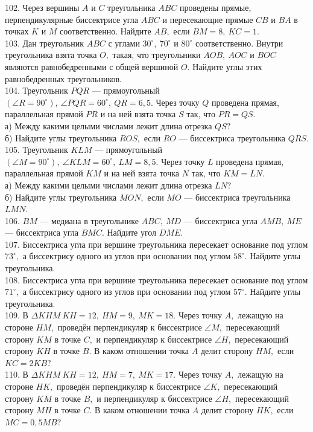 \documentclass[12pt]{article}
\begin{document}
102. Через вершины $A$ и $C$ треугольника $ABC$ проведены прямые, перпендикулярные биссектрисе угла $ABC$ и пересекающие прямые $CB$ и $BA$ в точках $K$ и $M$ соответственно. Найдите $AB,$ если $BM=8,\ KC=1.$\\
103. Дан треугольник $ABC$ с углами $30^\circ,\ 70^\circ$ и $80^\circ$ соответственно. Внутри треугольника взята точка $O,$ такая, что треугольники $AOB,\ AOC$ и $BOC$ являются равнобедренными с общей вершиной $O.$ Найдите углы этих равнобедренных треугольников.\\
104. Треугольник $PQR$ --- прямоугольный $(\angle R=90^\circ),\ \angle PQR=60^\circ,\ QR=6,5.$ Через точку $Q$ проведена прямая, параллельная прямой $PR$ и на ней взята точка $S$ так, что $PR=QS.$\\
а) Между какими целыми числами лежит длина отрезка $QS?$\\
б) Найдите углы треугольника $ROS,$ если $RO$ --- биссектриса треугольника $QRS.$\\
105. Треугольник $KLM$ --- прямоугольный $(\angle M=90^\circ),\ \angle KLM=60^\circ,\ LM=8,5.$ Через точку $L$ проведена прямая, параллельная прямой $KM$ и на ней взята точка $N$ так, что $KM=LN.$\\
а) Между какими целыми числами лежит длина отрезка $LN?$\\
б) Найдите углы треугольника $MON,$ если $MO$ --- биссектриса треугольника $LMN.$\\
106. $BM$ --- медиана в треугольнике $ABC,\ MD$ --- биссектриса угла $AMB,\ ME$ --- биссектриса угла $BMC.$ Найдите угол $DME.$\\
107. Биссектриса угла при вершине треугольника пересекает основание под углом $73^\circ,$ а биссектрису одного из углов при основании под углом $58^\circ.$ Найдите углы треугольника.\\
108. Биссектриса угла при вершине треугольника пересекает основание под углом $71^\circ,$ а биссектрису одного из углов при основании под углом $57^\circ.$ Найдите углы треугольника.\\
109. В $\Delta KHM\ KH=12,\ HM=9,\ MK=18.$ Через точку $A,$ лежащую на стороне $HM,$ проведён перпендикуляр к биссектрисе $\angle M,$ пересекающий сторону $KM$ в точке $C,$ и перпендикуляр к биссектрисе $\angle H,$ пересекающий сторону $KH$ в точке $B.$ В каком отношении точка $A$ делит сторону $HM,$ если $KC=2KB?$\\
110. В $\Delta KHM\ KH=12,\ HM=7,\ MK=17.$ Через точку $A,$ лежащую на стороне $HK,$ проведён перпендикуляр к биссектрисе $\angle K,$ пересекающий сторону $KM$ в точке $B,$ и перпендикуляр к биссектрисе $\angle H,$ пересекающий сторону $MH$ в точке $C.$ В каком отношении точка $A$ делит сторону $HK,$ если $MC=0,5MB?$\\
\end{document}
